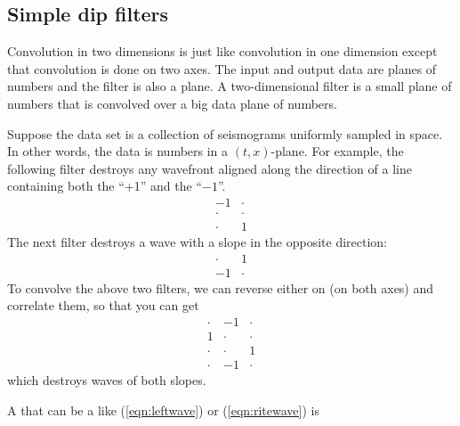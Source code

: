 \subsection{Simple dip filters}
Convolution in two dimensions is just like convolution
in one dimension except that convolution is done on two axes.
The input and output data are planes of numbers
and the filter is also a plane.
A two-dimensional filter  is
a small plane of numbers that
is convolved over a big data plane of numbers.
\par
Suppose the data set is a collection of seismograms
uniformly sampled in space.
In other words, the data is numbers in a $(t,x)$-plane.
For example, the following filter
destroys any wavefront
aligned along the direction of a line containing both the ``+1''
and the ``$-1$''.
\begin{equation}
   \begin{array}{cc}
        -1     &\cdot  \\
        \cdot  &\cdot  \\
        \cdot  &1      \end{array}
\label{eqn:leftwave}
\end{equation}
The next filter destroys a wave with a slope
in the opposite direction:
\begin{equation}
   \begin{array}{cc}
        \cdot  &1     \\
        -1     &\cdot  \end{array}
\label{eqn:ritewave}
\end{equation}
To convolve the above two filters,
we can reverse either on (on both axes) and correlate them,
so that you can get
\begin{equation}
        \begin{array}{ccc}
              \cdot &  -1  &\cdot      \\
                 1  &\cdot &\cdot      \\
              \cdot &\cdot &  1        \\
              \cdot &  -1  &\cdot      \end{array}
\label{eqn:twowave}
\end{equation}
which destroys waves of both slopes.
\par
A 
that can be a  like (\ref{eqn:leftwave}) or (\ref{eqn:ritewave}) is
